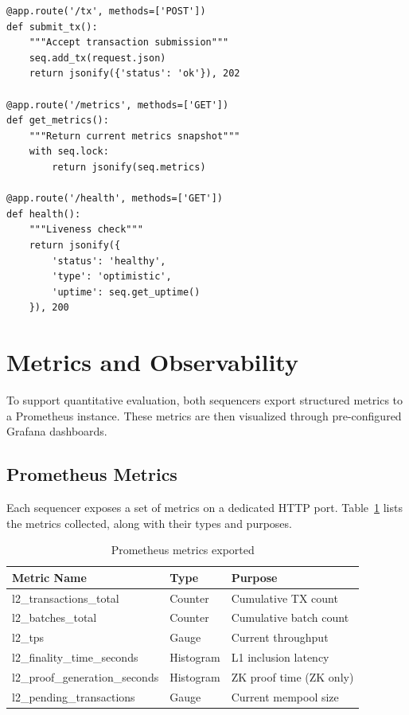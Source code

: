 \documentclass[
]{elteikthesis}[2024/04/26]
\begin{document}
\begin{listing}[H]
    \begin{verbatim}
@app.route('/tx', methods=['POST'])
def submit_tx():
    """Accept transaction submission"""
    seq.add_tx(request.json)
    return jsonify({'status': 'ok'}), 202

@app.route('/metrics', methods=['GET'])
def get_metrics():
    """Return current metrics snapshot"""
    with seq.lock:
        return jsonify(seq.metrics)

@app.route('/health', methods=['GET'])
def health():
    """Liveness check"""
    return jsonify({
        'status': 'healthy',
        'type': 'optimistic',
        'uptime': seq.get_uptime()
    }), 200
    \end{verbatim}
    \caption{Flask API endpoints}
    \label{lst:flask-api}
\end{listing}

\section{Metrics and Observability}

To support quantitative evaluation, both sequencers export structured metrics to a Prometheus instance. These metrics are then visualized through pre-configured Grafana dashboards.

\subsection{Prometheus Metrics}

Each sequencer exposes a set of metrics on a dedicated HTTP port. Table~\ref{tab:prometheus-metrics} lists the metrics collected, along with their types and purposes.

\begin{table}[h]
    \centering
    \begin{tabular}{p{4cm}|p{3cm}|p{3cm}}
        \hline
        \textbf{Metric Name} & \textbf{Type} & \textbf{Purpose} \\
        \hline
        l2\_transactions\_total & Counter & Cumulative TX count \\
        \hline
        l2\_batches\_total & Counter & Cumulative batch count \\
        \hline
        l2\_tps & Gauge & Current throughput \\
        \hline
        l2\_finality\_time\_seconds & Histogram & L1 inclusion latency \\
        \hline
        l2\_proof\_generation\_seconds & Histogram & ZK proof time (ZK only) \\
        \hline
        l2\_pending\_transactions & Gauge & Current mempool size \\
        \hline
    \end{tabular}
    \caption{Prometheus metrics exported}
    \label{tab:prometheus-metrics}
\end{table}
\end{document}
